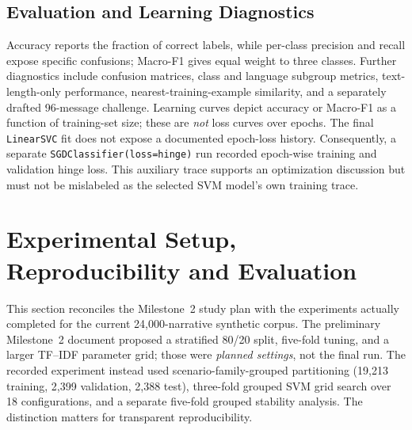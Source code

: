 \subsection{Evaluation and Learning Diagnostics}
Accuracy reports the fraction of correct labels, while per-class precision and recall expose specific confusions; Macro-F1 gives equal weight to three classes. Further diagnostics include confusion matrices, class and language subgroup metrics, text-length-only performance, nearest-training-example similarity, and a separately drafted 96-message challenge. Learning curves depict accuracy or Macro-F1 as a function of training-set size; these are \emph{not} loss curves over epochs. The final \texttt{LinearSVC} fit does not expose a documented epoch-loss history. Consequently, a separate \texttt{SGDClassifier(loss=hinge)} run recorded epoch-wise training and validation hinge loss. This auxiliary trace supports an optimization discussion but must not be mislabeled as the selected SVM model's own training trace.


\section{Experimental Setup, Reproducibility and Evaluation}
\label{sec:m2}
This section reconciles the Milestone~2 study plan with the experiments actually completed for the current 24,000-narrative synthetic corpus. The preliminary Milestone~2 document proposed a stratified 80/20 split, five-fold tuning, and a larger TF--IDF parameter grid; those were \emph{planned settings}, not the final run. The recorded experiment instead used scenario-family-grouped partitioning (19,213 training, 2,399 validation, 2,388 test), three-fold grouped SVM grid search over 18 configurations, and a separate five-fold grouped stability analysis. The distinction matters for transparent reproducibility.

